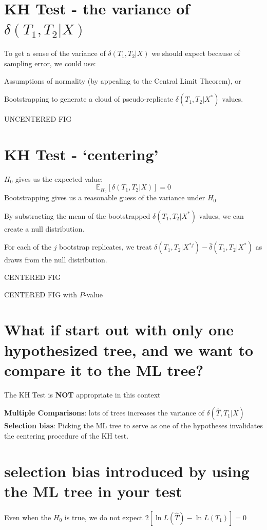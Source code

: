 \documentclass[landscape]{foils}
\begin{document}
\myNewSlide
\section*{KH Test - the variance of $\delta(T_1,T_2|X)$}
To get a sense of the variance of $\delta(T_1,T_2|X)$ we should expect because of sampling error, we could use:
\begin{compactenum}
	\item Assumptions of normality (by appealing to the Central Limit Theorem), or
	\item Bootstrapping to generate a cloud of pseudo-replicate $\delta(T_1,T_2|X^{\ast})$ values.
\end{compactenum}
\myNewSlide
UNCENTERED FIG

\myNewSlide
\section*{KH Test - `centering'}
$H_0$ gives us the expected value: $$\mathbb{E}_{H_0}\left[\delta(T_1,T_2|X)\right] = 0$$
Bootstrapping gives us a reasonable guess of the variance under $H_0$

By substracting the mean of the bootstrapped $\delta(T_1,T_2|X^{\ast})$ values, we can create a null distribution.

For each of the $j$ bootstrap replicates, we treat $\delta(T_1,T_2|X^{\ast j}) - \bar\delta(T_1,T_2|X^{\ast})$  as draws from the null distribution.

\myNewSlide
CENTERED FIG

\myNewSlide
CENTERED FIG with $P$-value


\myNewSlide
\section*{What if start out with only one hypothesized tree, and we want to compare it to the ML tree?}
The KH Test is {\bf NOT} appropriate in this context \citep[see][for discussion of this point]{GoldmanAR2000}

{\bf Multiple Comparisons}: lots of trees increases the variance of $\delta(\hat{T},T_1|X)$\\

{\bf Selection bias}: Picking the ML tree to serve as one of the hypotheses invalidates the centering procedure of the KH test.

\myNewSlide
\section*{selection bias introduced by using the ML tree in your test}
Even when the $H_0$ is true, we do not expect $2\left[\ln L(\hat{T}) - \ln L(T_1)\right]= 0$
\end{document}

